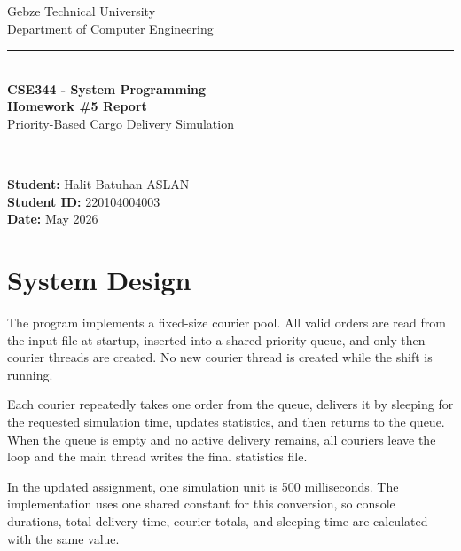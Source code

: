 \documentclass[11pt,a4paper]{article}
\begin{document}
\begin{titlepage}
    \centering
    \vspace*{2cm}
    {\Large Gebze Technical University}\\[0.4cm]
    {\large Department of Computer Engineering}\\[1.8cm]
    \rule{\linewidth}{0.5pt}\\[0.4cm]
    {\huge\bfseries CSE344 - System Programming}\\[0.3cm]
    {\Large\bfseries Homework \#5 Report}\\[0.2cm]
    {\large Priority-Based Cargo Delivery Simulation}\\[0.4cm]
    \rule{\linewidth}{0.5pt}\\[1.8cm]
    {\large\textbf{Student:} Halit Batuhan ASLAN}\\[0.3cm]
    {\large\textbf{Student ID:} 220104004003}\\[0.3cm]
    {\large\textbf{Date:} May 2026}
    \vfill
\end{titlepage}

\tableofcontents
\newpage

\section{System Design}

The program implements a fixed-size courier pool. All valid orders are read from the input file at startup, inserted into a shared priority queue, and only then courier threads are created. No new courier thread is created while the shift is running.

Each courier repeatedly takes one order from the queue, delivers it by sleeping for the requested simulation time, updates statistics, and then returns to the queue. When the queue is empty and no active delivery remains, all couriers leave the loop and the main thread writes the final statistics file.

In the updated assignment, one simulation unit is 500 milliseconds. The implementation uses one shared constant for this conversion, so console durations, total delivery time, courier totals, and sleeping time are calculated with the same value.
\end{document}
